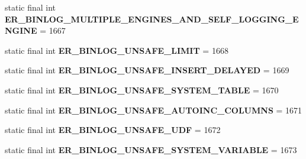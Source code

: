 \begin{DoxyCompactItemize}
static final int {\bfseries E\+R\+\_\+\+B\+I\+N\+L\+O\+G\+\_\+\+M\+U\+L\+T\+I\+P\+L\+E\+\_\+\+E\+N\+G\+I\+N\+E\+S\+\_\+\+A\+N\+D\+\_\+\+S\+E\+L\+F\+\_\+\+L\+O\+G\+G\+I\+N\+G\+\_\+\+E\+N\+G\+I\+NE} = 1667
\item 
\mbox{\label{classcom_1_1mysql_1_1jdbc_1_1_mysql_error_numbers_ace8bf69acd949a0a774438a03a06114a}} 
static final int {\bfseries E\+R\+\_\+\+B\+I\+N\+L\+O\+G\+\_\+\+U\+N\+S\+A\+F\+E\+\_\+\+L\+I\+M\+IT} = 1668
\item 
\mbox{\label{classcom_1_1mysql_1_1jdbc_1_1_mysql_error_numbers_a950359a1dd7527749db0b27088651f65}} 
static final int {\bfseries E\+R\+\_\+\+B\+I\+N\+L\+O\+G\+\_\+\+U\+N\+S\+A\+F\+E\+\_\+\+I\+N\+S\+E\+R\+T\+\_\+\+D\+E\+L\+A\+Y\+ED} = 1669
\item 
\mbox{\label{classcom_1_1mysql_1_1jdbc_1_1_mysql_error_numbers_a9b81613e41043c6adf80180be67901f0}} 
static final int {\bfseries E\+R\+\_\+\+B\+I\+N\+L\+O\+G\+\_\+\+U\+N\+S\+A\+F\+E\+\_\+\+S\+Y\+S\+T\+E\+M\+\_\+\+T\+A\+B\+LE} = 1670
\item 
\mbox{\label{classcom_1_1mysql_1_1jdbc_1_1_mysql_error_numbers_a3f9e5f656d184285edf43555eccaf576}} 
static final int {\bfseries E\+R\+\_\+\+B\+I\+N\+L\+O\+G\+\_\+\+U\+N\+S\+A\+F\+E\+\_\+\+A\+U\+T\+O\+I\+N\+C\+\_\+\+C\+O\+L\+U\+M\+NS} = 1671
\item 
\mbox{\label{classcom_1_1mysql_1_1jdbc_1_1_mysql_error_numbers_aad56797496566f8c500bcb38bdee43e2}} 
static final int {\bfseries E\+R\+\_\+\+B\+I\+N\+L\+O\+G\+\_\+\+U\+N\+S\+A\+F\+E\+\_\+\+U\+DF} = 1672
\item 
\mbox{\label{classcom_1_1mysql_1_1jdbc_1_1_mysql_error_numbers_a22fc737be878eeca18016eb853150bb3}} 
static final int {\bfseries E\+R\+\_\+\+B\+I\+N\+L\+O\+G\+\_\+\+U\+N\+S\+A\+F\+E\+\_\+\+S\+Y\+S\+T\+E\+M\+\_\+\+V\+A\+R\+I\+A\+B\+LE} = 1673
\item 
\mbox{\label{classcom_1_1mysql_1_1jdbc_1_1_mysql_error_numbers_a5381b31f6eec89e672f92ae3de3f440f}} 

\end{DoxyCompactItemize}
